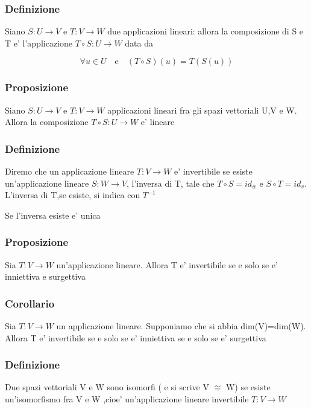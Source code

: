 \documentclass{article}
\begin{document}
\subsubsection{Definizione}
\begin{flushleft}
	Siano $S:U \to V$ e $T:V \to W$ due applicazioni lineari: allora la composizione di S e T
	e' l'applicazione $T \circ S:U \to W$ data da
\end{flushleft}
\begin{equation*}
	\forall u \in U \quad \text{e} \quad (T \circ S)(u)=T(S(u))
\end{equation*}
\subsubsection{Proposizione}
\begin{flushleft}
	Siano $S:U \to V$ e $T:V\to W$ applicazioni lineari fra gli spazi vettoriali U,V e W. Allora la composizione $T \circ S:U \to W$ e' lineare
\end{flushleft}
\subsubsection{Definizione}
\begin{flushleft}
	Diremo che un applicazione lineare $T:V \to W$ e' invertibile se esiste un'applicazione lineare
	$S:W \to V$, l'inversa di T, tale che $T\circ S=id_w$ e $S \circ T= id_v$. L'inversa di T,se esiste, si indica con $T^{-1}$
\end{flushleft}
\begin{flushleft}
	Se l'inversa esiste e' unica
\end{flushleft}
\subsubsection{Proposizione}
\begin{flushleft}
	Sia $T:V \to W$ un'applicazione lineare. Allora T e' invertibile se e solo se e' inniettiva e surgettiva
\end{flushleft}
\subsubsection{Corollario}
\begin{flushleft}
	Sia $T:V \to W$ un applicazione lineare. Supponiamo che si abbia dim(V)=dim(W). Allora T e' invertibile se e solo se e' inniettiva se e solo se e' surgettiva
\end{flushleft}
\subsubsection{Definizione}
\begin{flushleft}
	Due spazi vettoriali V e W sono isomorfi ( e si scrive V $\cong$ W) se esiste un'isomorfismo fra V e W
	,cioe' un'applicazione lineare invertibile $T:V \to W$
\end{flushleft}
\end{document}
